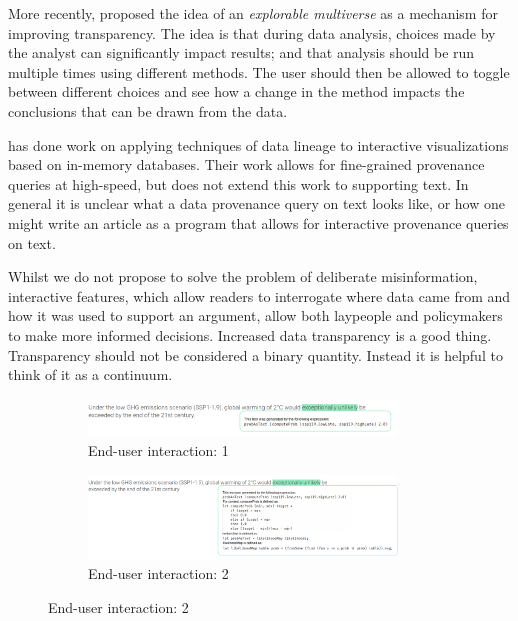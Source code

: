 More recently, \cite{dragicevic19} proposed the idea of an \emph{explorable multiverse} as a
mechanism for improving transparency. The idea is that during data analysis, choices made by
the analyst can significantly impact results; and that analysis should be run multiple times
using different methods. The user should then be allowed to toggle between different choices
and see how a change in the method impacts the conclusions that can be drawn from the data.

\cite{psallidas18} has done work on applying techniques of data lineage to interactive
visualizations based on in-memory databases. Their work allows for fine-grained
provenance queries at high-speed, but does not extend this work to supporting text.
In general it is unclear what a data provenance query on text looks like, or how one
might write an article as a program that allows for interactive provenance queries on text.

Whilst we do not propose to solve the problem of deliberate misinformation,
interactive features, which allow readers to interrogate where data came from and how
it was used to support an argument, allow both laypeople and policymakers to make more
informed decisions. Increased data transparency is a good thing. Transparency
should not be considered a binary quantity. Instead it is helpful to think of it as a continuum.

\begin{figure}
   \begin{subfigure}{\textwidth}
      \includegraphics[width=0.9\textwidth]{fig/ipcc-table-mockup-small.png}
      \caption{End-user interaction: 1}
      \label{fig:table-mockup-a}
   \end{subfigure}
   \begin{subfigure}{\textwidth}
      \includegraphics[width=0.9\textwidth]{fig/table-spm-fluid-mockup.png}
      \caption{End-user interaction: 2}
      \label{fig:table-mockup-b}
   \end{subfigure}
\end{figure}

